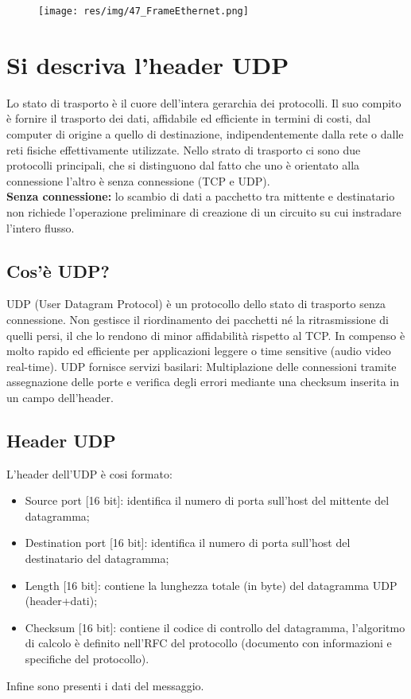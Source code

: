 \begin{figure}[H]
\centering
\texttt{[image: res/img/47\_FrameEthernet.png]}
\end{figure}

\section{Si descriva l'header UDP}

Lo stato di trasporto è il cuore dell'intera gerarchia dei protocolli. Il suo compito è fornire il trasporto dei dati, affidabile ed efficiente in termini di costi, dal computer di origine a quello di destinazione, indipendentemente dalla rete o dalle reti fisiche effettivamente utilizzate.
Nello strato di trasporto ci sono due protocolli principali, che si distinguono dal fatto che uno è orientato alla connessione l'altro è senza connessione (TCP e UDP).\\
\textbf{Senza connessione:} lo scambio di dati a pacchetto tra mittente e destinatario non richiede l'operazione preliminare di creazione di un circuito su cui instradare l'intero flusso.
\subsection{Cos'è UDP?}
UDP (User Datagram Protocol) è un protocollo dello stato di trasporto senza connessione. Non gestisce il riordinamento dei pacchetti né la ritrasmissione di quelli persi, il che lo rendono di minor affidabilità rispetto al TCP. In compenso è molto rapido ed efficiente per applicazioni leggere o time sensitive (audio video real-time).
UDP fornisce servizi basilari: Multiplazione delle connessioni tramite assegnazione delle porte e verifica degli errori mediante una checksum inserita in un campo dell'header.
\subsection{Header UDP}
L'header dell'UDP è cosi formato:
\begin{itemize}
\item	Source port [16 bit]: identifica il numero di porta sull'host del mittente del datagramma;
\item	Destination port [16 bit]: identifica il numero di porta sull'host del destinatario del datagramma;
\item	Length [16 bit]: contiene la lunghezza totale (in byte) del datagramma UDP (header+dati);
\item	Checksum [16 bit]: contiene il codice di controllo del datagramma, l'algoritmo di calcolo è definito nell'RFC del protocollo (documento con informazioni e specifiche del protocollo).
\end{itemize}
Infine sono presenti i dati del messaggio.

